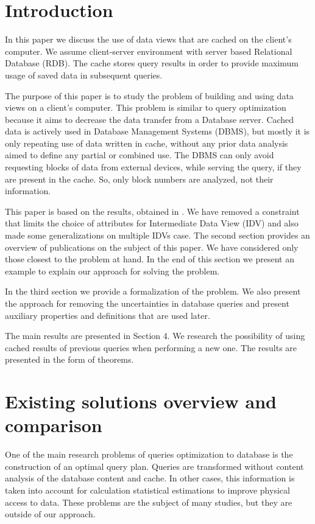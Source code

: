 \documentclass[prodmode,acmtods]{acmsmall} %
\begin{document}
\maketitle


\section{Introduction}
In this paper we discuss the use of data views that are
cached on the client's computer. We assume client-server environment with
server based Relational Database (RDB). The cache stores query results in order
to provide maximum usage of saved data in subsequent queries.

The purpose of this paper is to study the problem of building and using data
views on a client's computer. This problem is similar to query optimization
because it aims to decrease the data transfer from a Database server. Cached
data is actively used in Database Management Systems (DBMS), but mostly it is
only repeating use of data written in cache, without any prior data analysis
aimed to define any partial or combined use. The DBMS can only avoid requesting
blocks of data from external devices, while serving the query, if they are
present in the cache. So, only block numbers are analyzed, not their information.

This paper is based on the results, obtained in \cite{zyk_pol}. We have removed
a constraint that limits the choice of attributes for Intermediate Data View
(IDV) and also made some generalizations on multiple IDVs case.
\cite{codd}
The second section provides an overview of publications on the subject of this
paper. We have considered only those closest to the problem at hand. In the end
of this section we present an example to explain our approach for solving the
problem.

In the third section we provide a formalization of the problem. We also present
the approach for removing the uncertainties in database queries and present
auxiliary properties and definitions that are used later.

The main results are presented in Section 4. We research the possibility of
using cached results of previous queries when performing a new one. The results
are presented in the form of theorems.

\section{Existing solutions overview and comparison}
One of the main research problems of queries optimization to database is the
construction of an optimal query plan. Queries are transformed without content
analysis of the database content and cache. In other cases, this information is
taken into account for calculation statistical estimations to improve physical
access to data. These problems are the subject of many studies, but they are
outside of our approach.
\end{document}
